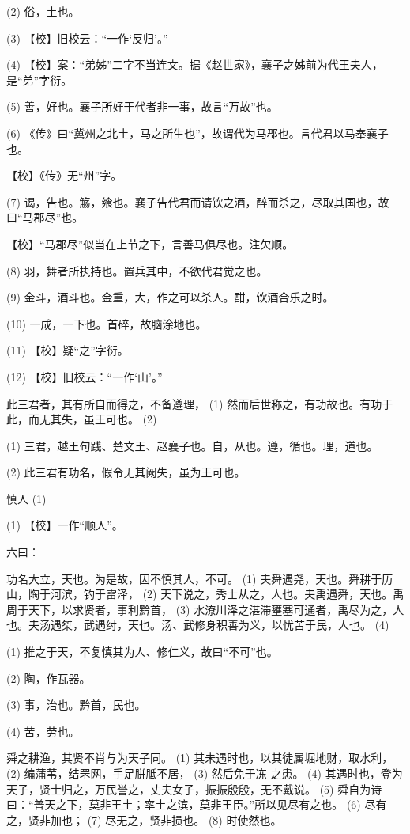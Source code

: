 \documentclass[12pt,UTF8]{ctexbook}
\begin{document}
(2) 俗，土也。

(3) 【校】旧校云：“一作‘反归’。”

(4) 【校】案：“弟姊”二字不当连文。据《赵世家》，襄子之姊前为代王夫人，是“弟”字衍。

(5) 善，好也。襄子所好于代者非一事，故言“万故”也。

(6) 《传》曰“冀州之北土，马之所生也”，故谓代为马郡也。言代君以马奉襄子也。

【校】《传》无“州”字。

(7) 谒，告也。觞，飨也。襄子告代君而请饮之酒，醉而杀之，尽取其国也，故曰“马郡尽”也。

【校】“马郡尽”似当在上节之下，言善马俱尽也。注欠顺。

(8) 羽，舞者所执持也。置兵其中，不欲代君觉之也。

(9) 金斗，酒斗也。金重，大，作之可以杀人。酣，饮酒合乐之时。

(10) 一成，一下也。首碎，故脑涂地也。

(11) 【校】疑“之”字衍。

(12) 【校】旧校云：“一作‘山’。”

此三君者，其有所自而得之，不备遵理， (1) 然而后世称之，有功故也。有功于此，而无其失，虽王可也。 (2)

(1) 三君，越王句践、楚文王、赵襄子也。自，从也。遵，循也。理，道也。

(2) 此三君有功名，假令无其阙失，虽为王可也。





慎人 (1)


(1) 【校】一作“顺人”。

六曰：

功名大立，天也。为是故，因不慎其人，不可。 (1) 夫舜遇尧，天也。舜耕于历山，陶于河滨，钓于雷泽， (2) 天下说之，秀士从之，人也。夫禹遇舜，天也。禹周于天下，以求贤者，事利黔首， (3) 水潦川泽之湛滞壅塞可通者，禹尽为之，人也。夫汤遇桀，武遇纣，天也。汤、武修身积善为义，以忧苦于民，人也。 (4)

(1) 推之于天，不复慎其为人、修仁义，故曰“不可”也。

(2) 陶，作瓦器。

(3) 事，治也。黔首，民也。

(4) 苦，劳也。

舜之耕渔，其贤不肖与为天子同。 (1) 其未遇时也，以其徒属堀地财，取水利， (2) 编蒲苇，结罘网，手足胼胝不居， (3) 然后免于冻 之患。 (4) 其遇时也，登为天子，贤士归之，万民誉之，丈夫女子，振振殷殷，无不戴说。 (5) 舜自为诗曰：“普天之下，莫非王土；率土之滨，莫非王臣。”所以见尽有之也。 (6) 尽有之，贤非加也； (7) 尽无之，贤非损也。 (8) 时使然也。
\end{document}

